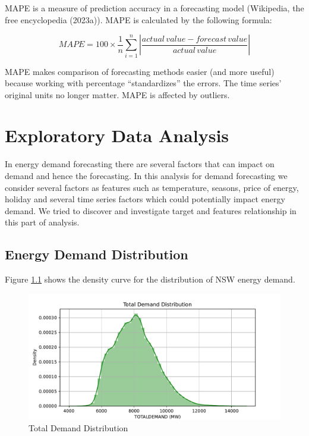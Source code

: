 \documentclass[mstat,12pt]{unswthesis}
\begin{document}
MAPE is a measure of prediction accuracy in a forecasting model
(Wikipedia, the free encyclopedia (2023a)). MAPE is calculated by the
following formula:

\[
MAPE = 100 \times \frac{1}{n} \sum_{i=1}^{n} \left| \frac{\mathit{actual \, value} - \mathit{forecast \, value}}{\mathit{actual \, value}} \right|
\]

MAPE makes comparison of forecasting methods easier (and more useful)
because working with percentage ``standardizes'' the errors. The time
series' original units no longer matter. MAPE is affected by outliers.

\hypertarget{s-data-analysis}{%
\chapter{Exploratory Data Analysis}\label{s-data-analysis}}

In energy demand forecasting there are several factors that can impact
on demand and hence the forecasting. In this analysis for demand
forecasting we consider several factors as features such as temperature,
seasons, price of energy, holiday and several time series factors which
could potentially impact energy demand. We tried to discover and
investigate target and features relationship in this part of analysis.

\hypertarget{energy-demand-distribution}{%
\section{Energy Demand Distribution}\label{energy-demand-distribution}}

Figure \ref{fig:plot-density-curve-energy-demand} shows the density
curve for the distribution of NSW energy demand.

\begin{figure}[H]
\includegraphics[width=1\linewidth,]{ZZSC9020_Group_Report_files/figure-latex/plot-density-curve-energy-demand-1} \caption{Total Demand Distribution}\label{fig:plot-density-curve-energy-demand}
\end{figure}
\end{document}
